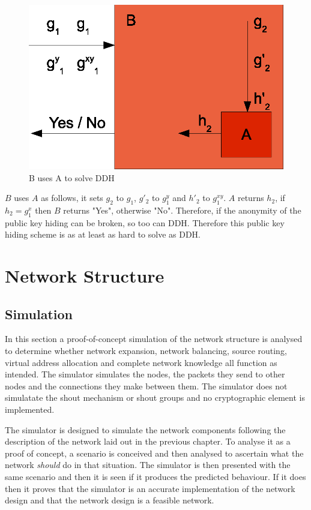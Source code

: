 \documentclass[ %
                    author={Luke Murray},
                supervisor={Dr. Simon Hollis},
                     title={Shadow Peer-to-Peer Networks},
                  subtitle={},
                    degree={MEng},
                      year={2013} ]{thesis}
\begin{document}
\begin{figure}[h]
    \centering
    \includegraphics{diagrams/crypto_proof.eps}
    \caption{B uses A to solve DDH}
    \label{crypto_diag}
\end{figure}

$B$ uses $A$ as follows, it sets $g_2$ to $g_1$, $g\prime_2$ to $g_1^{y}$ and $h\prime_2$ to $g_1^{xy}$. $A$ returns $h_2$, if $h_2 = g_1^{x}$ then $B$ returns "Yes", otherwise "No". Therefore, if the anonymity of the public key hiding can be broken, so too can DDH. Therefore this public key hiding scheme is as at least as hard to solve as DDH.

\section{Network Structure}

\subsection{Simulation}

In this section a proof-of-concept simulation of the network structure is analysed to determine whether network expansion, network balancing, source routing, virtual address allocation and complete network knowledge all function as intended. The simulator simulates the nodes, the packets they send to other nodes and the connections they make between them. The simulator does not simulatate the shout mechanism or shout groups and no cryptographic element is implemented.

The simulator is designed to simulate the network components following the description of the network laid out in the previous chapter. To analyse it as a proof of concept, a scenario is conceived and then analysed to ascertain what the network {\em should} do in that situation. The simulator is then presented with the same scenario and then it is seen if it produces the predicted behaviour.  If it does then it proves that the simulator is an accurate implementation of the network design and that the network design is a feasible network.
\end{document}
